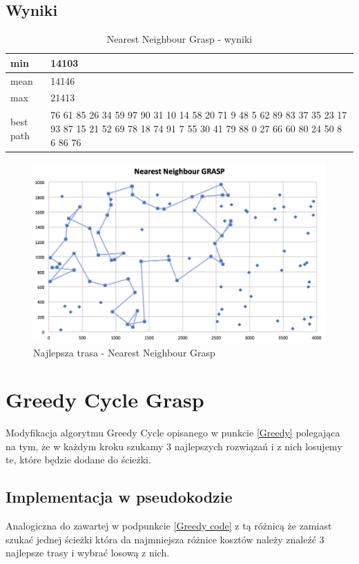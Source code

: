 \documentclass[a4paper 10pt]{article}
\begin{document}
\subsection{Wyniki}

\begin{table}[H]
\center
\caption{Nearest Neighbour Grasp - wyniki}
\label{Nearest Neighbour Grasp- wyniki}
\begin{tabular}{|p{1cm}|p{14cm}|}
\hline
min       &  14103\\ \hline
mean      &  14146\\ \hline
max       &  21413\\ \hline
best path &  76
61
85
26
34
59
97
90
31
10
14
58
20
71
9 
48
5 
62
89
83
37
35
23
17
93
87
15
21
52
69
78
18
74
91
7 
55
30
41
79
88
0 
27
66
60
80
24
50
8 
6 
86
76 \\ \hline
\end{tabular}
\end{table}

\begin{figure} [H]
\centering
\includegraphics[angle=0,width = 1\textwidth, height=!]{images/NNG.png}
\caption{Najlepsza trasa - Nearest Neighbour Grasp}
\label{Rys. NNG}
\end{figure}
\section{Greedy Cycle Grasp}
Modyfikacja algorytmu Greedy Cycle opisanego w punkcie \ref{Greedy} polegająca na tym, że w każdym kroku szukamy 3 najlepszych rozwiązań i z nich losujemy te, które będzie dodane do ścieżki.
\subsection{Implementacja w pseudokodzie}
Analogiczna do zawartej w podpunkcie \ref{Greedy code} z tą różnicą że zamiast szukać jednej ścieżki która da najmniejsza różnice kosztów należy znaleźć 3 najlepsze trasy i wybrać losową z nich.
\end{document}
